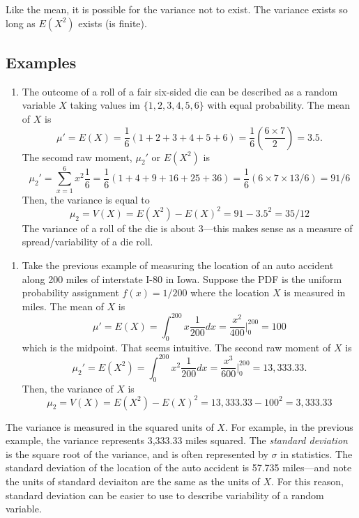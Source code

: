 \documentclass[
]{book}
\providecommand{\tightlist}{%
  \setlength{\itemsep}{0pt}\setlength{\parskip}{0pt}}
\begin{document}
Like the mean, it is possible for the variance not to exist. The variance exists so long as \(E(X^2)\) exists (is finite).

\hypertarget{examples-1}{%
\subsection{Examples}\label{examples-1}}

\begin{enumerate}
\def\labelenumi{\arabic{enumi}.}
\tightlist
\item
  The outcome of a roll of a fair six-sided die can be described as a random variable \(X\) taking values im \(\{1,2,3,4,5,6\}\) with equal probability. The mean of \(X\) is
  \[\mu' = E(X) = \frac{1}{6}(1+2+3+4+5+6) = \frac{1}{6}\left(\frac{6\times 7}{2}\right) = 3.5.\]
  The secomd raw moment, \(\mu_2'\) or \(E(X^2)\) is
  \[\mu_2' = \sum_{x=1}^6 x^2\frac{1}{6} = \frac{1}{6}(1+4+9+16+25+36) = \frac{1}{6}\left(6\times 7\times 13 / 6\right) = 91/6\]
  Then, the variance is equal to
  \[\mu_2 = V(X) = E(X^2) - E(X)^2 = 91-3.5^2 = 35/12\]
  The variance of a roll of the die is about 3---this makes sense as a measure of spread/variability of a die roll.
\end{enumerate}

\begin{enumerate}
\def\labelenumi{\arabic{enumi}.}
\setcounter{enumi}{1}
\tightlist
\item
  Take the previous example of measuring the location of an auto accident along 200 miles of interstate I-80 in Iowa. Suppose the PDF is the uniform probability assignment \(f(x) = 1/200\) where the location \(X\) is measured in miles. The mean of \(X\) is
  \[\mu' = E(X) = \int_0^{200} x \frac{1}{200}dx = \frac{x^2}{400}|_0^{200} = 100\]
  which is the midpoint. That seems intuitive. The second raw moment of \(X\) is
  \[\mu_2' = E(X^2) = \int_0^{200} x^2 \frac{1}{200}dx = \frac{x^3}{600}|_0^{200} = 13,333.33.\]
  Then, the variance of \(X\) is
  \[\mu_2 = V(X) = E(X^2) - E(X)^2 =  13,333.33 - 100^2 = 3,333.33\]
\end{enumerate}

The variance is measured in the squared units of \(X\). For example, in the previous example, the variance represents 3,333.33 miles squared. The \emph{standard deviation} is the square root of the variance, and is often represented by \(\sigma\) in statistics. The standard deviation of the location of the auto accident is 57.735 miles---and note the units of standard deviaiton are the same as the units of \(X\). For this reason, standard deviation can be easier to use to describe variability of a random variable.
\end{document}
